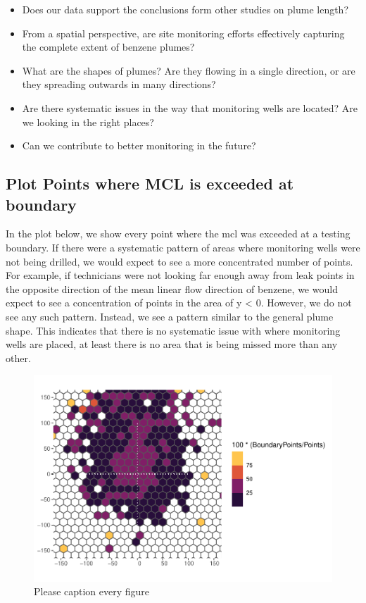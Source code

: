 \documentclass[draft,linenumbers]{agujournal2018}
\begin{document}
\begin{itemize}
\item
  Does our data support the conclusions form other studies on plume
  length?
\item
  From a spatial perspective, are site monitoring efforts effectively
  capturing the complete extent of benzene plumes?
\item
  What are the shapes of plumes? Are they flowing in a single direction,
  or are they spreading outwards in many directions?
\item
  Are there systematic issues in the way that monitoring wells are
  located? Are we looking in the right places?
\item
  Can we contribute to better monitoring in the future?
\end{itemize}

\subsection{Plot Points where MCL is exceeded at boundary}

In the plot below, we show every point where the mcl was exceeded at a
testing boundary. If there were a systematic pattern of areas where
monitoring wells were not being drilled, we would expect to see a more
concentrated number of points. For example, if technicians were not
looking far enough away from leak points in the opposite direction of
the mean linear flow direction of benzene, we would expect to see a
concentration of points in the area of y \textless{} 0. However, we do
not see any such pattern. Instead, we see a pattern similar to the
general plume shape. This indicates that there is no systematic issue
with where monitoring wells are placed, at least there is no area that
is being missed more than any other.

\begin{figure}[h]
\includegraphics{CA_Benzene_Plumes_files/figure-latex/boundaryPts-1} \caption{Please caption every figure}\label{fig:boundaryPts}
\end{figure}
\end{document}
